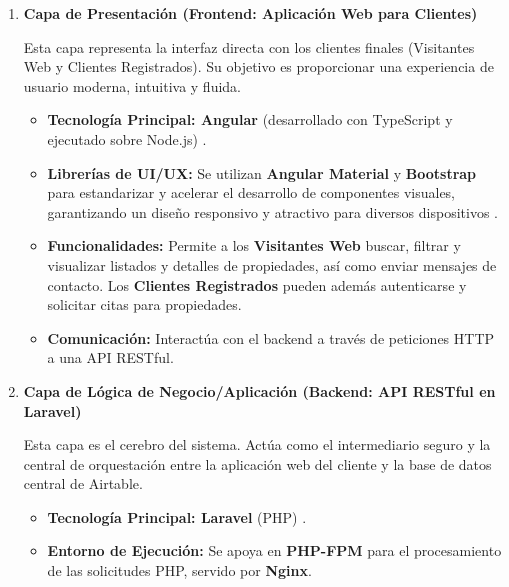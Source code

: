 \begin{enumerate}

    \item \textbf{Capa de Presentación (Frontend: Aplicación Web para Clientes)}

    Esta capa representa la interfaz directa con los clientes finales (Visitantes Web y Clientes Registrados). Su objetivo es proporcionar una experiencia de usuario moderna, intuitiva y fluida.

    \begin{itemize}
        \item \textbf{Tecnología Principal: Angular} (desarrollado con TypeScript y ejecutado sobre Node.js) \cite{angular2024overview}.
        
        \item \textbf{Librerías de UI/UX:} Se utilizan \textbf{Angular Material} y \textbf{Bootstrap} para estandarizar y acelerar el desarrollo de componentes visuales, garantizando un diseño responsivo y atractivo para diversos dispositivos \cite{angular2024material} \cite{bootstrap2024docs}.
        
        \item \textbf{Funcionalidades:} Permite a los \textbf{Visitantes Web} buscar, filtrar y visualizar listados y detalles de propiedades, así como enviar mensajes de contacto. Los \textbf{Clientes Registrados} pueden además autenticarse y solicitar citas para propiedades.
        
        \item \textbf{Comunicación:} Interactúa con el backend a través de peticiones HTTP a una API RESTful.
    \end{itemize}

\clearpage

    \item \textbf{Capa de Lógica de Negocio/Aplicación (Backend: API RESTful en Laravel)}

    Esta capa es el cerebro del sistema. Actúa como el intermediario seguro y la central de orquestación entre la aplicación web del cliente y la base de datos central de Airtable.

    \begin{itemize}
        \item \textbf{Tecnología Principal: Laravel} (PHP) \cite{laravel2024docs}.
        
        \item \textbf{Entorno de Ejecución:} Se apoya en \textbf{PHP-FPM} para el procesamiento de las solicitudes PHP, servido por \textbf{Nginx}.
        

\end{itemize}
\end{enumerate}
